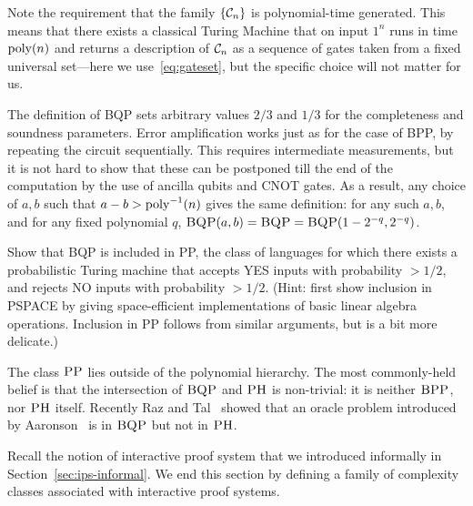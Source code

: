 Note the requirement that the family $\{\mathcal{C}_n\}$ is polynomial-time generated. This means that there exists a classical Turing Machine that on input $1^n$ runs in time $\operatorname{poly}(n)$ and returns a description of $\mathcal{C}_n$ as a sequence of gates taken from a fixed universal set---here we use~\eqref{eq:gateset}, but the specific choice will not matter for us. 

The definition of BQP sets arbitrary values $2/3$ and $1/3$ for the completeness and soundness parameters. Error amplification works just as for the case of BPP, by repeating the circuit sequentially. This requires intermediate measurements, but it is not hard to show that these can be postponed till the end of the computation by the use of ancilla qubits and CNOT gates.
 As a result, any choice of $a,b$ such that $a-b > \operatorname{poly}^{-1}(n)$ gives the same definition: for any such $a,b$, and for any fixed polynomial $q$,  $\textsc{BQP}(a,b)=\textsc{BQP}=\textsc{BQP}(1-2^{-q},2^{-q})$. 


\begin{exercise}\label{ex:pp}
Show that BQP is included in PP, the class of languages for which there exists a probabilistic Turing machine that accepts YES inputs with probability $>1/2$, and rejects NO inputs with probability $>1/2$. (Hint: first show inclusion in PSPACE by giving space-efficient implementations of basic linear algebra operations. Inclusion in PP follows from similar arguments, but is a bit more delicate.)
\end{exercise}

The class $\textsc{PP}$ lies outside of the polynomial hierarchy. The most commonly-held belief is that the intersection of $\textsc{BQP}$ and $\textsc{PH}$ is non-trivial: it is neither $\textsc{BPP}$, nor $\textsc{PH}$ itself. Recently Raz and Tal~\cite{raz2019oracle} showed that an oracle problem introduced by Aaronson~\cite{aaronson2010bqp} is in $\textsc{BQP}$ but not in $\textsc{PH}$. 

Recall the notion of interactive proof system that we introduced informally in Section~\ref{sec:ips-informal}. 
We end this section by defining a family of complexity classes associated with interactive proof systems. 

